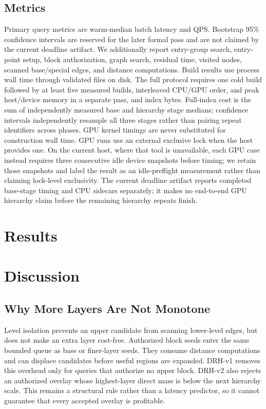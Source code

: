 \documentclass[sigconf,review,anonymous]{acmart}
\begin{document}
\subsection{Metrics}
Primary query metrics are warm-median batch latency and QPS. Bootstrap 95\%
confidence intervals are reserved for the later formal pass and are not claimed
by the current deadline artifact. We additionally report entry-group search, entry-point
setup, block authorization, graph search, residual time, visited nodes, scanned
base/special edges, and distance computations.  Build results use process wall
time through validated files on disk. The full protocol requires one cold build followed by at least five
measured builds, interleaved CPU/GPU order, and peak host/device memory in a separate
pass, and index bytes.  Full-index cost is the sum of independently measured
base and hierarchy stage medians; confidence intervals independently resample
all three stages rather than pairing repeat identifiers across phases.  GPU
kernel timings are never substituted for construction wall time. GPU runs use an external
exclusive lock when the host provides one.  On the current host, where that
tool is unavailable, each GPU case instead requires three consecutive idle
device snapshots before timing; we retain those snapshots and label the
result as an idle-preflight measurement rather than claiming lock-level
exclusivity. The current deadline artifact reports completed base-stage timing
and CPU sidecars separately; it makes no end-to-end GPU hierarchy claim before
the remaining hierarchy repeats finish.

\section{Results}
\authoritativeResults
\authoritativeRecallQPSFigures

\section{Discussion}
\subsection{Why More Layers Are Not Monotone}
Level isolation prevents an upper candidate from scanning lower-level edges,
but does not make an extra layer cost-free.  Authorized block seeds enter the
same bounded queue as base or finer-layer seeds.  They consume distance
computations and can displace candidates before useful regions are expanded.
DRH-v1 removes this overhead only for queries that authorize no upper block.
DRH-v2 also rejects an authorized overlay whose highest-layer direct mass is
below the next hierarchy scale. This remains a structural rule rather than a
latency predictor, so it cannot guarantee that every accepted overlay is
profitable.
\end{document}
